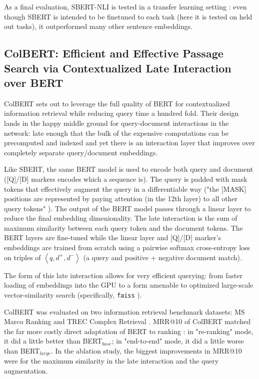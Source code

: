 \documentclass[11pt]{article}
\begin{document}
As a final evaluation, SBERT-NLI is tested in a transfer learning setting \cite{Conneau2018}: even though SBERT is intended to be finetuned to each task (here it is tested on held out tasks), it outperformed many other sentence embeddings. 

\subsection{ColBERT: Efficient and Effective Passage Search via Contextualized Late Interaction over BERT \cite{ColBERT}}

ColBERT sets out to leverage the full quality of BERT for contextualized information retrieval while reducing query time a hundred fold. Their design lands in the happy middle ground for query-document interactions in the network: late enough that the bulk of the expensive computations can be precomputed and indexed and yet there is an interaction layer that improves over completely separate query/document embeddings. 

Like SBERT, the same BERT model is used to encode both query and document ([Q]/[D] markers encodes which a sequence is). The query is padded with mask tokens that effectively augment the query in a differentiable way ("the [MASK] positions are represented by paying attention (in the 12th layer) to all other query tokens" \cite{okhat2020}). The output of the BERT model passes through a linear layer to reduce the final embedding dimenionality. The late interaction is the sum of maximum similarity between each query token and the document tokens. The BERT layers are fine-tuned while the linear layer and [Q]/[D] marker's embeddings are trained from scratch using a pairwise softmax cross-entropy loss on triples of $\left< q, d^+, d^-\right>$ (a query and positive + negative document match). 

The form of this late interaction allows for very efficient querying: from faster loading of embeddings into the GPU to a form amenable to optimized large-scale vector-similarity search (specifically, \texttt{faiss} \cite{faiss}).

ColBERT was evaluated on two information retrieval benchmark datasets: MS Marco Ranking \cite{MSMarco} and TREC Complex Retrieval \cite{TREC-CAR}. MRR@10 of ColBERT matched the far more costly direct adaptation of BERT to ranking \cite{Nogueira2019}: in "re-ranking" mode, it did a little better than BERT$_{base}$; in "end-to-end" mode, it did a little worse than BERT$_{large}$. In the ablation study, the biggest improvements in MRR@10 were for the maximum similarity in the late interaction and the query augmentation. 
\end{document}
